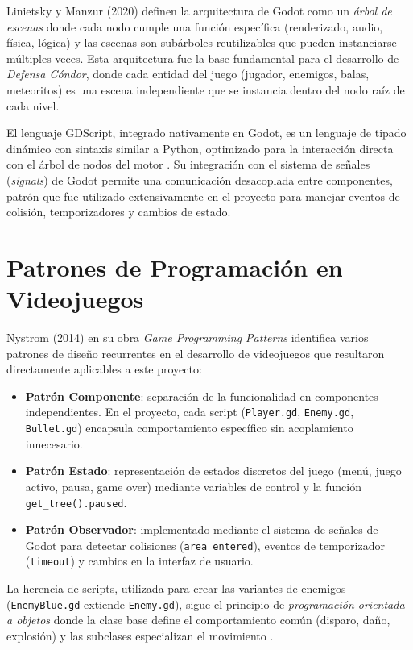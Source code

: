 \documentclass[12pt, a4paper, oneside]{report}
\begin{document}
Linietsky y Manzur (2020) definen la arquitectura de Godot como un \textit{árbol de escenas} donde cada nodo cumple una función específica (renderizado, audio, física, lógica) y las escenas son subárboles reutilizables que pueden instanciarse múltiples veces. Esta arquitectura fue la base fundamental para el desarrollo de \textit{Defensa Cóndor}, donde cada entidad del juego (jugador, enemigos, balas, meteoritos) es una escena independiente que se instancia dentro del nodo raíz de cada nivel.

El lenguaje GDScript, integrado nativamente en Godot, es un lenguaje de tipado dinámico con sintaxis similar a Python, optimizado para la interacción directa con el árbol de nodos del motor \cite{godot_docs}. Su integración con el sistema de señales (\textit{signals}) de Godot permite una comunicación desacoplada entre componentes, patrón que fue utilizado extensivamente en el proyecto para manejar eventos de colisión, temporizadores y cambios de estado.

\section{Patrones de Programación en Videojuegos}

Nystrom (2014) en su obra \textit{Game Programming Patterns} identifica varios patrones de diseño recurrentes en el desarrollo de videojuegos que resultaron directamente aplicables a este proyecto:

\begin{itemize}
    \item \textbf{Patrón Componente}: separación de la funcionalidad en componentes independientes. En el proyecto, cada script (\texttt{Player.gd}, \texttt{Enemy.gd}, \texttt{Bullet.gd}) encapsula comportamiento específico sin acoplamiento innecesario.
    \item \textbf{Patrón Estado}: representación de estados discretos del juego (menú, juego activo, pausa, game over) mediante variables de control y la función \texttt{get\_tree().paused}.
    \item \textbf{Patrón Observador}: implementado mediante el sistema de señales de Godot para detectar colisiones (\texttt{area\_entered}), eventos de temporizador (\texttt{timeout}) y cambios en la interfaz de usuario.
\end{itemize}

La herencia de scripts, utilizada para crear las variantes de enemigos (\texttt{EnemyBlue.gd} extiende \texttt{Enemy.gd}), sigue el principio de \textit{programación orientada a objetos} donde la clase base define el comportamiento común (disparo, daño, explosión) y las subclases especializan el movimiento \cite{nystrom2014}.
\end{document}
